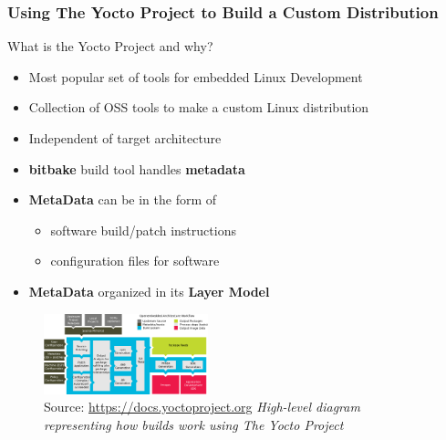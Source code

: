 \documentclass[8pt,compress,aspectratio=169]{beamer}
\newcommand\LightBold[1]{\textcolor{VSBlueLight}{\textbf{#1}}}
\newcommand\DarkBoldP[1]{\textcolor{VSPurpleDark}{\textbf{#1}}}
\begin{document}
\begin{frame}
  \frametitle{Using The Yocto Project to Build a Custom Distribution}
  \begin{minipage}{0.475\textwidth}
    \begin{block}{What is the Yocto Project and why?}
        \begin{itemize}
          \item Most popular set of tools for embedded Linux Development
          \item Collection of OSS tools to make a custom Linux distribution
          \item Independent of target architecture
          \item \DarkBoldP{bitbake} build tool handles \LightBold{metadata}
          \item \LightBold{MetaData} can be in the form of 
            \begin{itemize}
              \item software build/patch instructions
              \item configuration files for software
            \end{itemize}
          \item \LightBold{MetaData} organized in its \LightBold{Layer Model}
        \end{itemize}
    \end{block}
  \end{minipage}
  \hfill
  \begin{minipage}{0.475\textwidth}
    \begin{figure}
      \center
      \includegraphics[width=180px]{assets/diagrams/yocto-environment.png}
      \caption{Source: \href{https://docs.yoctoproject.org}{https://docs.yoctoproject.org}\hspace{\textwidth}
      \it High-level diagram representing how builds work using The Yocto Project}
    \end{figure}
  \end{minipage}
\end{frame}
\end{document}
